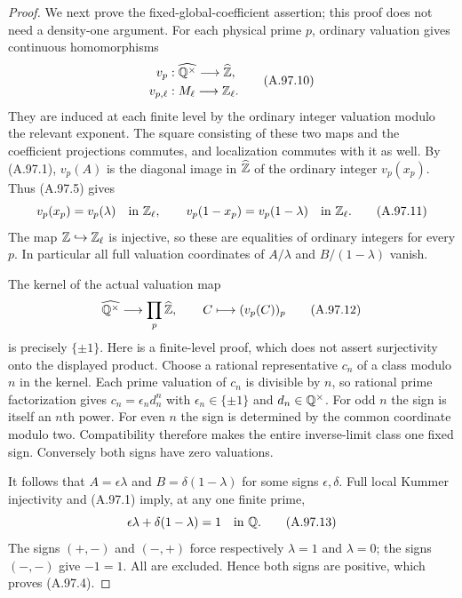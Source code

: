 \begin{proof}
We next prove the fixed-global-coefficient assertion;
this proof does not need a density-one argument.
For each physical prime $p$, ordinary valuation gives
continuous homomorphisms
\[
 \begin{split}
   v_p &: \widehat{\mathbb Q^\times}\longrightarrow\widehat{\mathbb Z},\\
   v_{p,\ell} &: M_\ell\longrightarrow\mathbb Z_\ell.
 \end{split}
\tag{A.97.10}
\]
They are induced at each finite level by the ordinary
integer valuation modulo the relevant exponent.  The
square consisting of these two maps and the coefficient
projections commutes, and localization commutes with it
as well.  By (A.97.1), $v_p(A)$ is the diagonal image
in $\widehat{\mathbb Z}$ of the ordinary integer $v_p(x_p)$.
Thus (A.97.5) gives
\[
        v_p(x_p)=v_p(\lambda)\quad\hbox{in }\mathbb Z_\ell,
       \qquad
        v_p(1-x_p)=v_p(1-\lambda)\quad\hbox{in }\mathbb Z_\ell.
\tag{A.97.11}
\]
The map $\mathbb Z\hookrightarrow\mathbb Z_\ell$ is injective, so
these are equalities of ordinary integers for every $p$.
In particular all full valuation coordinates of
$A/\lambda$ and $B/(1-\lambda)$ vanish.

The kernel of the actual valuation map
\[
          \widehat{\mathbb Q^\times}\longrightarrow
                     \prod_p\widehat{\mathbb Z},
                 \qquad C\longmapsto(v_p(C))_p
\tag{A.97.12}
\]
is precisely $\{\pm1\}$.
Here is a finite-level proof, which does not assert
surjectivity onto the displayed product.
Choose a rational representative $c_n$ of a class
modulo $n$ in the kernel.  Each prime valuation of $c_n$
is divisible by $n$, so rational prime factorization
gives $c_n=\epsilon_n d_n^n$ with
$\epsilon_n\in\{\pm1\}$ and $d_n\in\mathbb Q^\times$.
For odd $n$ the sign is itself an $n$th power.
For even $n$ the sign is determined by the common
coordinate modulo two.  Compatibility therefore makes
the entire inverse-limit class one fixed sign.
Conversely both signs have zero valuations.

It follows that
$A=\epsilon\lambda$ and $B=\delta(1-\lambda)$ for
some signs $\epsilon,\delta$.
Full local Kummer injectivity and (A.97.1) imply, at any
one finite prime,
\[
                   \epsilon\lambda+
                           \delta(1-\lambda)=1
                         \quad\hbox{in }\mathbb Q.
\tag{A.97.13}
\]
The signs $(+,-)$ and $(-,+)$ force respectively
$\lambda=1$ and $\lambda=0$; the signs $(-,-)$ give
$-1=1$.  All are excluded.  Hence both signs are positive,
which proves (A.97.4).


\end{proof}
